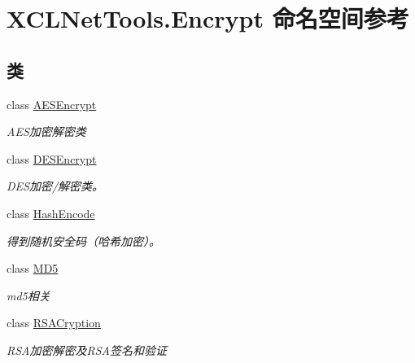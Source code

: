 \hypertarget{namespace_x_c_l_net_tools_1_1_encrypt}{}\section{X\+C\+L\+Net\+Tools.\+Encrypt 命名空间参考}
\label{namespace_x_c_l_net_tools_1_1_encrypt}
\subsection*{类}
\begin{DoxyCompactItemize}
\item 
class \hyperlink{class_x_c_l_net_tools_1_1_encrypt_1_1_a_e_s_encrypt}{A\+E\+S\+Encrypt}
\begin{DoxyCompactList}\small\item\em A\+E\+S加密解密类 \end{DoxyCompactList}\item 
class \hyperlink{class_x_c_l_net_tools_1_1_encrypt_1_1_d_e_s_encrypt}{D\+E\+S\+Encrypt}
\begin{DoxyCompactList}\small\item\em D\+E\+S加密/解密类。 \end{DoxyCompactList}\item 
class \hyperlink{class_x_c_l_net_tools_1_1_encrypt_1_1_hash_encode}{Hash\+Encode}
\begin{DoxyCompactList}\small\item\em 得到随机安全码（哈希加密）。 \end{DoxyCompactList}\item 
class \hyperlink{class_x_c_l_net_tools_1_1_encrypt_1_1_m_d5}{M\+D5}
\begin{DoxyCompactList}\small\item\em md5相关 \end{DoxyCompactList}\item 
class \hyperlink{class_x_c_l_net_tools_1_1_encrypt_1_1_r_s_a_cryption}{R\+S\+A\+Cryption}
\begin{DoxyCompactList}\small\item\em R\+S\+A加密解密及\+R\+S\+A签名和验证 \end{DoxyCompactList}\end{DoxyCompactItemize}
